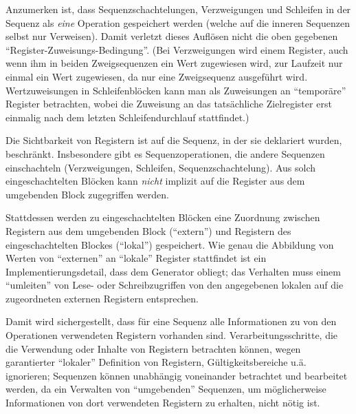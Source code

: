 \documentclass[twoside,a4paper,fleqn,12pt]{book}
\begin{document}
Anzumerken ist, dass Sequenzschachtelungen, Verzweigungen und Schleifen in der Sequenz als \emph{eine} Operation gespeichert
werden (welche auf die inneren Sequenzen selbst nur Verweisen). Damit verletzt dieses Auflösen nicht die oben gegebenen "`Register-Zuweisungs-Bedingung"'.
(Bei Verzweigungen wird einem Register, auch wenn ihm in beiden Zweigsequenzen ein Wert zugewiesen wird, zur Laufzeit nur einmal
ein Wert zugewiesen, da nur eine Zweigsequenz ausgeführt wird.
Wertzuweisungen in Schleifenblöcken kann man als Zuweisungen an "`temporäre"' Register betrachten, wobei die Zuweisung an
das tatsächliche Zielregister erst einmalig nach dem letzten Schleifendurchlauf stattfindet.)

Die Sichtbarkeit von Registern ist auf die Sequenz, in der sie deklariert wurden, beschränkt.
Insbesondere gibt es Sequenzoperationen, die andere Sequenzen einschachteln (Verzweigungen, Schleifen, Sequenzschachtelung).
Aus solch eingeschachtelten Blöcken kann \emph{nicht} implizit auf die Register aus dem umgebenden Block
zugegriffen werden.

Stattdessen werden zu eingeschachtelten Blöcken eine Zuordnung zwischen Registern aus dem umgebenden Block
("`extern"') und
Registern des eingeschachtelten Blockes ("`lokal"') gespeichert.
Wie genau die Abbildung von Werten von "`externen"' an "`lokale"' Register stattfindet ist ein Implementierungsdetail, dass dem Generator obliegt;
das Verhalten muss einem "`umleiten"' von Lese- oder Schreibzugriffen von den angegebenen lokalen auf die zugeordneten externen
Registern entsprechen.

Damit wird sichergestellt, dass für eine Sequenz alle Informationen zu von den Operationen verwendeten Registern vorhanden sind.
Verarbeitungsschritte, die die Verwendung oder Inhalte von Registern betrachten können, wegen garantierter "`lokaler"' Definition
von Registern, Gültigkeitsbereiche u.ä. ignorieren; Sequenzen können unabhängig voneinander betrachtet und bearbeitet werden,
da ein Verwalten von "`umgebenden"' Sequenzen, um möglicherweise Informationen von dort verwendeten Registern zu erhalten,
nicht nötig ist.

\end{document}
